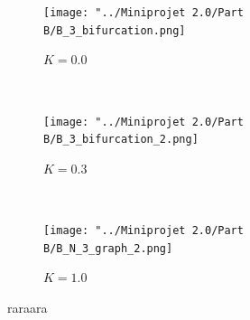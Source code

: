 \documentclass[10pt,a4paper,oneside,twocolumn]{article}
\numberwithin{equation}{section} %
\begin{document}
    \begin{figure}
    \centering
	\begin{subfigure}[b]{0.3\textwidth}
	    \texttt{[image: "../Miniprojet 2.0/Part B/B\_3\_bifurcation.png]}
	    \caption{$K=0.0$}
	\end{subfigure}
	~ 
	\begin{subfigure}[b]{0.3\textwidth}
	    \texttt{[image: "../Miniprojet 2.0/Part B/B\_3\_bifurcation\_2.png]}
	    \caption{$K=0.3$}
	\end{subfigure}
	~ 
	\begin{subfigure}[b]{0.3\textwidth}
	    \texttt{[image: "../Miniprojet 2.0/Part B/B\_N\_3\_graph\_2.png]}
	    \caption{$K=1.0$}
	\end{subfigure}
	\caption{raraara}
    \end{figure}
\end{document}
